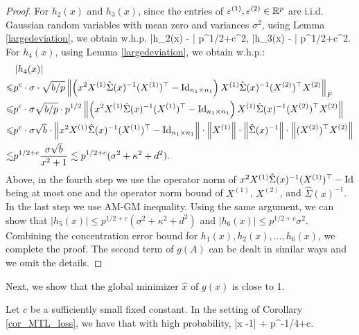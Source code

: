 \begin{proof}
For $h_2(x)$ and $h_3(x)$, since the entries of $\varepsilon^{(1)},\varepsilon^{(2)}\in \mathbb{R}^p$ are i.i.d. Gaussian random variables with mean zero and variances $\sigma^2$, using Lemma \ref{largedeviation}, we obtain w.h.p.
\be\label{eq_hA23}\left|h_2(x) - \right| \lesssim p^{1/2+c}\sigma^2, \quad \left|h_3(x) - \right| \lesssim p^{1/2+c}\sigma^2.\ee
For $h_4(x)$, using Lemma \ref{largedeviation}, we obtain w.h.p.:
\begin{align}
			&\left|h_4(x)\right| \nonumber\\
	\leqslant& p^{c}\cdot \sigma \cdot \sqrt{b / p}\left\| \left(x^2 X^{(1)}\hat\Sigma(x)^{-1} (X^{(1)})^\top-\operatorname{Id}_{n_1\times n_1}\right) X^{(1)} \hat\Sigma(x)^{-1} (X^{(2)})^\top X^{(2)} \right\|_F\nonumber \\
	\leqslant& p^{c}\cdot \sigma \sqrt{b / p} \cdot p^{1/2} \left\| \left(x^2 X^{(1)}\hat\Sigma(x)^{-1} (X^{(1)})^\top-\operatorname{Id}_{n_1\times n_1}\right) X^{(1)} \hat\Sigma(x)^{-1} (X^{(2)})^\top X^{(2)} \right\|  \nonumber\\
	\leqslant&  p^{c}\cdot \sigma \sqrt{b} \cdot \left\|  x^2 X^{(1)}\hat\Sigma(x)^{-1} (X^{(1)})^\top - \operatorname{Id}_{n_1\times n_1} \right\| \cdot \left\|X^{(1)}\right\| \cdot \left\|\hat\Sigma(x)^{-1}\right\| \cdot \left\| (X^{(2)})^\top X^{(2)} \right\|  \nonumber\\
	\lesssim& p^{1/2+c}\frac{\sigma \sqrt{b}}{x^2+1} \lesssim p^{1/2+c}(\sigma^2 + \kappa^2 + d^2).\label{eq_hA4}
\end{align}
Above, in the fourth step we use the operator norm of $x^2 X^{(1)}\hat\Sigma(x)^{-1} (X^{(1)})^\top - \operatorname{Id}$ being at most one and the operator norm bound of $X^{(1)}$, $X^{(2)}$, and $\hat{\Sigma}(x)^{-1}$.
In the last step we use AM-GM inequality. Using the same argument, we can show that
$\left|h_5(x)\right| \le p^{1/2+c}(\sigma^2 + \kappa^2 + d^2)$ and $\left|h_6(x)\right| \le p^{1/2+c}\sigma^2$.
Combining the concentration error bound for $h_1(x), h_2(x), \dots, h_6(x)$, we complete the proof.
The second term of $g(A)$ can be dealt in similar ways and we omit the details.
\end{proof}

Next, we show that the global minimizer $\hat x$ of $g(x)$ is close to 1.
\begin{claim}\label{lem_hat_v}
	Let $c$ be a sufficiently small fixed constant.
	In the setting of Corollary \ref{cor_MTL_loss}, we have that with high probability,
	\be\label{hatw_add1}|\hat x -1|\le  {} + p^{-1/4+c}.
	\ee
\end{claim}

